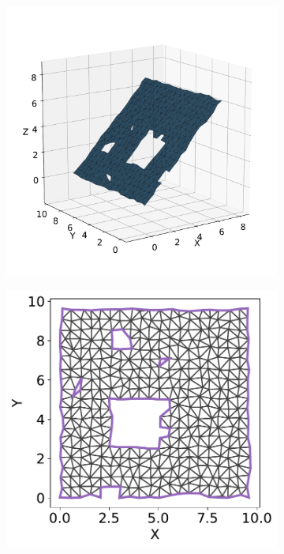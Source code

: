 \begin{figure}[H]
  \begin{subfigure}[t]{.33\linewidth}
    \centering\includegraphics[clip,trim=0cm 0cm 0cm 0cm, width=.99\linewidth]{chapter_3_polylidar3d/imgs/polygon/PolygonExtraction_a.pdf}
    \caption{\label{fig:ch3_polygon_extraction_a}}
  \end{subfigure}
  \hfill
  \begin{subfigure}[t]{.30\linewidth}
    \centering\includegraphics[clip,trim=0cm 0cm 0cm 0cm,width=.99\linewidth]{chapter_3_polylidar3d/imgs/polygon/PolygonExtraction_b1.pdf}

\end{subfigure}
\end{figure}
